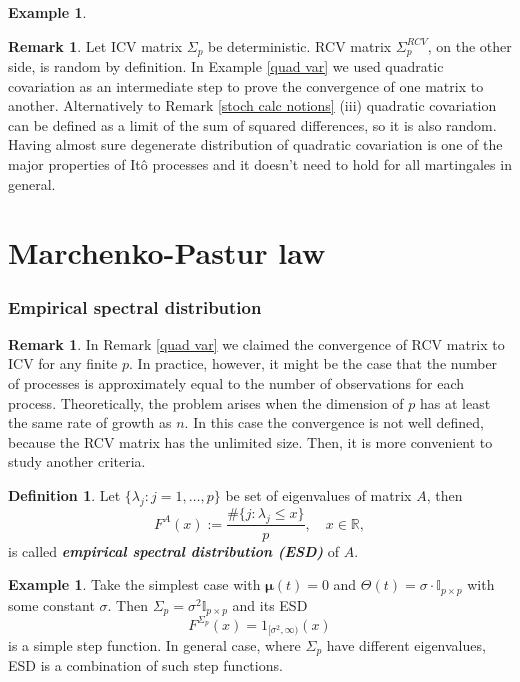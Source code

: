 \documentclass[a4paper,11pt]{article}
\theoremstyle{plain}
\theoremstyle{definition}
\newtheorem{defn}[thm]{Definition}
\newtheorem{exmp}[thm]{Example}
\newtheorem{rmrk}[thm]{Remark}
\newcommand{\MR}{\mathbb{R}}
\newcommand{\define}[1]{\textit{\textbf{#1}}}
\begin{document}
\begin{exmp}
		\begin{rmrk}
			Let ICV matrix $\Sigma_p$ be deterministic. RCV matrix $\Sigma_p^{RCV}$, on the other side, is random by definition. In Example \ref{quad var} we used quadratic covariation as an intermediate step to prove the convergence of one matrix to another. Alternatively to Remark \ref{stoch calc notions} (iii) quadratic covariation can be defined as a limit of the sum of squared differences, so it is also random. Having almost sure degenerate distribution of quadratic covariation is one of the major properties of Itô processes and it doesn't need to hold for all martingales in general.
		\end{rmrk}
		
	\end{exmp}
	
	\pagebreak
	\part{Marchenko-Pastur law}
	\section*{Empirical spectral distribution}
	\begin{rmrk}
		In Remark \ref{quad var} we claimed the convergence of RCV matrix to ICV for any finite $p$. In practice, however, it might be the case that the number of processes is approximately equal to the number of observations for each process. Theoretically, the problem arises when the dimension of $p$ has at least the same rate of growth as $n$. In this case the convergence is not well defined, because the RCV matrix has the unlimited size.
		Then, it is more convenient to study another criteria.
	\end{rmrk}
	
	\begin{defn}
		Let $\{\lambda_j:j=1,\dots, p\}$ be set of eigenvalues of matrix $A$, then
		\[F^{A}(x) := \frac{\#\{j:\lambda_j \leq x\}}{p}, \quad x \in \MR, \]
		is called \define{empirical spectral distribution (ESD)} of $A$.
	\end{defn}
	
	\begin{exmp} \label{ESD finite p}
		Take the simplest case with $\boldsymbol{\mu}(t) = 0$ and $\Theta(t) = \sigma \cdot \mathbb{I}_{p \times p}$ with some constant $\sigma$. Then $\Sigma_p = \sigma^2 \mathbb{I}_{p \times p}$ and its ESD
		\[ F^{\Sigma_p}(x) = 1_{[\sigma^2, \infty)}(x) \]
		is a simple step function. In general case, where $\Sigma_p$ have different eigenvalues, ESD is a combination of such step functions.
	\end{exmp}
	
\end{document}
